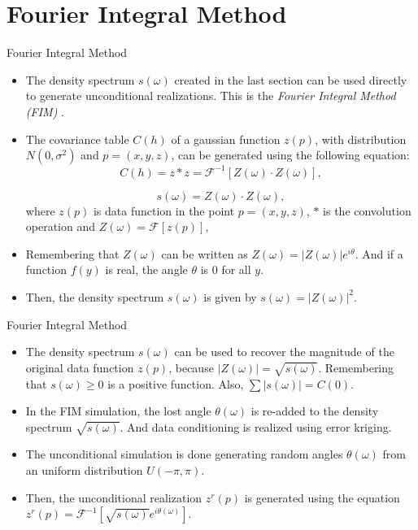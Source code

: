 \section{Fourier Integral Method}
\begin{frame}{Fourier Integral Method}
  \begin{itemize}
  	\item The density spectrum $s(\omega)$ created in the last section can be used directly to generate unconditional realizations. This is the \textit{Fourier Integral Method (FIM)} \cite{pardo1993fourier}.
    \item The covariance table $C(h)$ of a gaussian function $z(p)$, with distribution $N(0, \sigma^2)$ and $p=(x,y,z)$, can be generated using the following equation:
    $$
    C(h) = z * z = \mathscr{F}^{-1}[Z(\omega) \cdot Z(\omega)],
    $$
    
    $$
    s(\omega) = Z(\omega) \cdot Z(\omega),
    $$
    where $z(p)$ is data function in the point $p=(x,y,z)$, $*$ is the convolution operation and $Z(\omega) = \mathscr{F}[z(p)]$,
    \item Remembering that $Z(\omega)$ can be written as $Z(\omega)=|Z(\omega)|e^{i\theta}$. And if a function $f(y)$ is real, the angle $\theta$ is 0 for all $y$. 
    \item Then, the density spectrum $s(\omega)$ is given by $s(\omega) = |Z(\omega)|^2$.
  \end{itemize}
\end{frame}

\begin{frame}{Fourier Integral Method}
  \begin{itemize}
  	\item The density spectrum $s(\omega)$ can be used  to recover the magnitude of the original data function $z(p)$, because $|Z(\omega)| = \sqrt{s(\omega)}$. Remembering that $s(\omega) \geq 0$ is a positive function. Also, $\sum |s(\omega)| = C(0)$.
    \item In the FIM simulation, the lost angle $\theta(\omega)$ is re-added to the density spectrum  $\sqrt{s(\omega)}$. And data conditioning is realized using error kriging.
    \item The unconditional simulation is done generating random angles $\theta(\omega)$ from an uniform distribution $U(-\pi,\pi)$.
    \item Then, the unconditional realization $z^{r}(p)$ is generated using the equation $z^{r}(p) = \mathscr{F}^{-1}[\sqrt{s(\omega)}e^{i\theta(\omega)}]$. 
  \end{itemize}
\end{frame}


